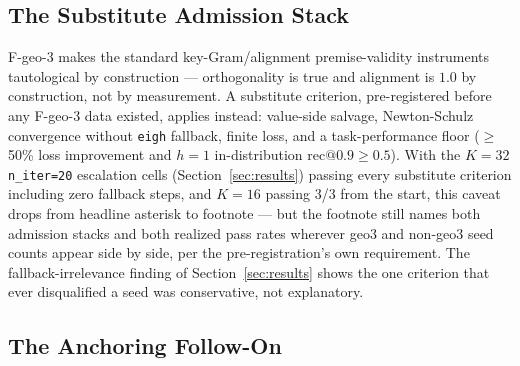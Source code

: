 \subsection{The Substitute Admission Stack}

F-geo-3 makes the standard key-Gram/alignment premise-validity
instruments tautological by construction --- orthogonality is true and
alignment is $1.0$ by construction, not by measurement. A substitute
criterion, pre-registered before any F-geo-3 data existed, applies
instead: value-side salvage, Newton-Schulz convergence without
\texttt{eigh} fallback, finite loss, and a task-performance floor
($\geq$50\% loss improvement and $h{=}1$ in-distribution
$\mathrm{rec@0.9}\geq0.5$). With the $K{=}32$ \texttt{n\_iter=20}
escalation cells (Section~\ref{sec:results}) passing every substitute
criterion including zero fallback steps, and $K{=}16$ passing 3/3 from
the start, this caveat drops from headline asterisk to footnote --- but
the footnote still names both admission stacks and both realized pass
rates wherever geo3 and non-geo3 seed counts appear side by side, per
the pre-registration's own requirement. The fallback-irrelevance finding
of Section~\ref{sec:results} shows the one criterion that ever
disqualified a seed was conservative, not explanatory.

\subsection{The Anchoring Follow-On}

